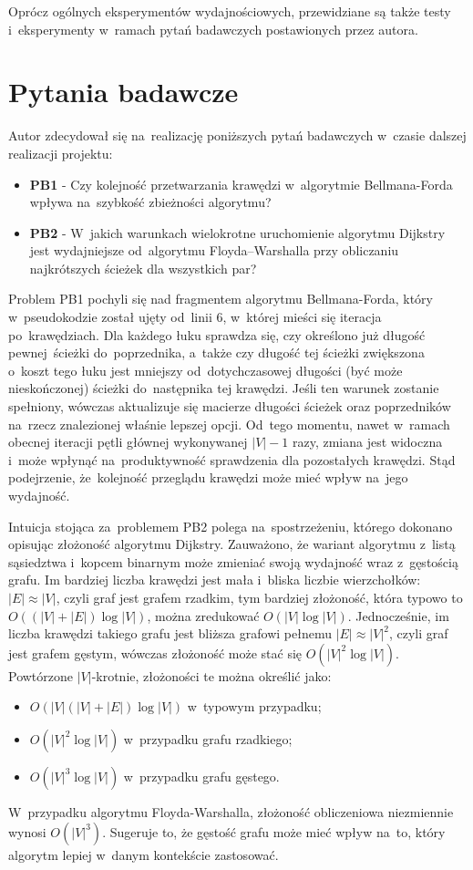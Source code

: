 \documentclass[11pt,a4paper,oneside]{report}
\begin{document}
Oprócz ogólnych eksperymentów wydajnościowych, przewidziane są także testy i~eksperymenty w~ramach pytań badawczych postawionych przez autora.

\section{Pytania badawcze}
\label{sec:pytania-badawcze}

Autor zdecydował się na~realizację poniższych pytań badawczych w~czasie dalszej realizacji projektu:
\begin{itemize}
	\item \textbf{PB1} - Czy kolejność przetwarzania krawędzi w~algorytmie Bellmana-Forda wpływa na~szybkość zbieżności algorytmu?
	\item \textbf{PB2} - W~jakich warunkach wielokrotne uruchomienie algorytmu Dijkstry jest wydajniejsze od~algorytmu Floyda–Warshalla przy obliczaniu najkrótszych ścieżek dla wszystkich par?
\end{itemize}

Problem PB1 pochyli się nad fragmentem algorytmu Bellmana-Forda, który w~pseudokodzie został ujęty od~linii 6, w~której mieści się iteracja po~krawędziach. Dla każdego łuku sprawdza się, czy określono już długość pewnej ścieżki do~poprzednika, a~także czy długość tej ścieżki zwiększona o~koszt tego łuku jest mniejszy od~dotychczasowej długości (być może nieskończonej) ścieżki do~następnika tej krawędzi. Jeśli ten warunek zostanie spełniony, wówczas aktualizuje się macierze długości ścieżek oraz poprzedników na~rzecz znalezionej właśnie lepszej opcji. Od~tego momentu, nawet w~ramach obecnej iteracji pętli głównej wykonywanej $|V| - 1$ razy, zmiana jest widoczna i~może wpłynąć na~produktywność sprawdzenia dla pozostałych krawędzi. Stąd podejrzenie, że~kolejność przeglądu krawędzi może mieć wpływ na~jego wydajność.

Intuicja stojąca za~problemem PB2 polega na~spostrzeżeniu, którego dokonano opisując złożoność algorytmu Dijkstry. Zauważono, że wariant algorytmu z~listą sąsiedztwa i~kopcem binarnym może zmieniać swoją wydajność wraz z~gęstością grafu. Im bardziej liczba krawędzi jest mała i~bliska liczbie wierzchołków: $|E| \approx |V|$, czyli graf jest grafem rzadkim, tym bardziej złożoność, która typowo to $O((|V| + |E|)\log |V|)$, można zredukować $O(|V|\log |V|)$. Jednocześnie, im liczba krawędzi takiego grafu jest bliższa grafowi pełnemu $|E| \approx |V|^2$, czyli graf jest grafem gęstym, wówczas złożoność może stać się $O(|V|^2 \log |V|)$. Powtórzone $|V|$-krotnie, złożoności te można określić jako:
\begin{itemize}
	\item $O(|V|(|V|+|E|)\log |V|)$ w~typowym przypadku;
	\item $O(|V|^2 \log |V|)$ w~przypadku grafu rzadkiego;
	\item $O(|V|^3 \log |V|)$ w~przypadku grafu gęstego.
\end{itemize} 
W~przypadku algorytmu Floyda-Warshalla, złożoność obliczeniowa niezmiennie wynosi $O(|V|^3)$. Sugeruje to, że gęstość grafu może mieć wpływ na~to, który algorytm lepiej w~danym kontekście zastosować.
\end{document}
